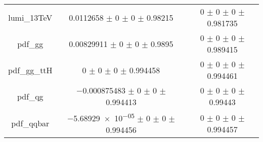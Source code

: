 \begin{table}
\begin{tabular}{ccc}
lumi\_13TeV & \num{0.0112658} $\pm$ \num{0} $\pm$ \num{0} $\pm$ \num{0.98215} & \num{0} $\pm$ \num{0} $\pm$ \num{0} $\pm$ \num{0.981735}\\
pdf\_gg & \num{0.00829911} $\pm$ \num{0} $\pm$ \num{0} $\pm$ \num{0.9895} & \num{0} $\pm$ \num{0} $\pm$ \num{0} $\pm$ \num{0.989415}\\
pdf\_gg\_ttH & \num{0} $\pm$ \num{0} $\pm$ \num{0} $\pm$ \num{0.994458} & \num{0} $\pm$ \num{0} $\pm$ \num{0} $\pm$ \num{0.994461}\\
pdf\_qg & \num{-0.000875483} $\pm$ \num{0} $\pm$ \num{0} $\pm$ \num{0.994413} & \num{0} $\pm$ \num{0} $\pm$ \num{0} $\pm$ \num{0.99443}\\
pdf\_qqbar & \num{-5.68929e-05} $\pm$ \num{0} $\pm$ \num{0} $\pm$ \num{0.994456} & \num{0} $\pm$ \num{0} $\pm$ \num{0} $\pm$ \num{0.994457}\\
\bottomrule
\end{tabular}
\end{table}